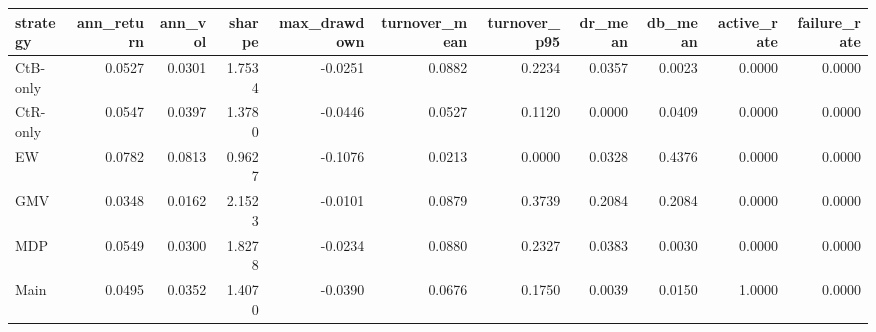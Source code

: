 \begin{tabular}{lrrrrrrrrrr}
\toprule
strategy & ann_return & ann_vol & sharpe & max_drawdown & turnover_mean & turnover_p95 & dr_mean & db_mean & active_rate & failure_rate \\
\midrule
CtB-only & 0.0527 & 0.0301 & 1.7534 & -0.0251 & 0.0882 & 0.2234 & 0.0357 & 0.0023 & 0.0000 & 0.0000 \\
CtR-only & 0.0547 & 0.0397 & 1.3780 & -0.0446 & 0.0527 & 0.1120 & 0.0000 & 0.0409 & 0.0000 & 0.0000 \\
EW & 0.0782 & 0.0813 & 0.9627 & -0.1076 & 0.0213 & 0.0000 & 0.0328 & 0.4376 & 0.0000 & 0.0000 \\
GMV & 0.0348 & 0.0162 & 2.1523 & -0.0101 & 0.0879 & 0.3739 & 0.2084 & 0.2084 & 0.0000 & 0.0000 \\
MDP & 0.0549 & 0.0300 & 1.8278 & -0.0234 & 0.0880 & 0.2327 & 0.0383 & 0.0030 & 0.0000 & 0.0000 \\
Main & 0.0495 & 0.0352 & 1.4070 & -0.0390 & 0.0676 & 0.1750 & 0.0039 & 0.0150 & 1.0000 & 0.0000 \\
\bottomrule
\end{tabular}
